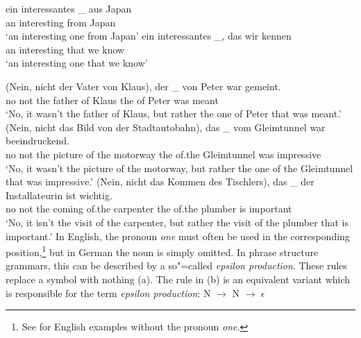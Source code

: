 \ex 
\gll ein interessantes \_ aus  Japan\\
     an  interesting   {} from Japan\\
\glt `an interesting one from Japan'
\ex 
\gll ein interessantes \_, das  wir kennen\\
     an  interesting   {}  that we  know\\
\glt `an interesting one that we know'
\zl

\eal
\label{ex-nounless-np-relational-noun}
\ex 
\gll (Nein, nicht der Vater von Klaus), der \_ von Peter war gemeint.\\
	\spacebr{}no not the father of Klaus the {} of Peter was meant\\
\glt `No, it wasn't the father of Klaus, but rather the one of Peter that was meant.'
\ex 
\gll (Nein, nicht das Bild von der Stadtautobahn), das \_ vom Gleimtunnel war beeindruckend.\\
	 \spacebr{}no not the picture of the motorway the {} of.the Gleimtunnel was impressive\\
\glt `No, it wasn't the picture of the motorway, but rather the one of the Gleimtunnel that was impressive.'
\ex 
\gll (Nein, nicht das Kommen des Tischlers), das \_ der Installateurin ist wichtig.\\
	 \spacebr{}no not the coming of.the carpenter the {} of.the plumber is important\\
\glt `No, it isn't the visit of the carpenter, but rather the visit of the plumber that is important.'
\zl
In English, the pronoun
\emph{one} must often be used in the corresponding position,\footnote{%
  See \citet[Section~4.12]{FLGR2012a} for English examples without the
  pronoun \emph{one}.
} but in German the noun is
simply omitted.
In phrase structure grammars, this can be described by a so"=called \emph{epsilon production}.
These rules replace a symbol with nothing (a). The rule in (b) is an equivalent variant which is responsible for the term \emph{epsilon production}:
\eal
\label{np-epsilon}
\ex N $\to$
\ex N $\to$ $\epsilon$
\zl 

